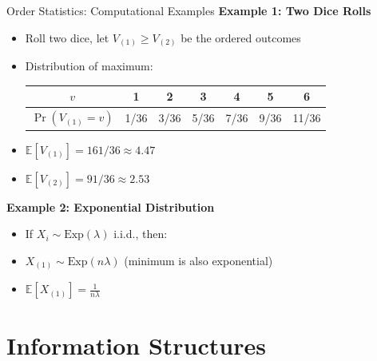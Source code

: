 \documentclass[xcolor={x11names}]{beamer}
\begin{document}
\begin{frame}{Order Statistics: Computational Examples}
\textbf{Example 1: Two Dice Rolls}
\begin{itemize}
  \item Roll two dice, let $V_{(1)} \geq V_{(2)}$ be the ordered outcomes
  \item Distribution of maximum:
  \begin{center}
  \begin{tabular}{c|cccccc}
  $v$ & 1 & 2 & 3 & 4 & 5 & 6 \\
  \hline
  $\Pr(V_{(1)} = v)$ & 1/36 & 3/36 & 5/36 & 7/36 & 9/36 & 11/36
  \end{tabular}
  \end{center}
  \item $\mathbb{E}[V_{(1)}] = 161/36 \approx 4.47$
  \item $\mathbb{E}[V_{(2)}] = 91/36 \approx 2.53$
\end{itemize}


\textbf{Example 2: Exponential Distribution}
\begin{itemize}
  \item If $X_i \sim \text{Exp}(\lambda)$ i.i.d., then:
  \item $X_{(1)} \sim \text{Exp}(n\lambda)$ (minimum is also exponential)
  \item $\mathbb{E}[X_{(1)}] = \frac{1}{n\lambda}$
\end{itemize}
\end{frame}

\section{Information Structures}
\end{document}
